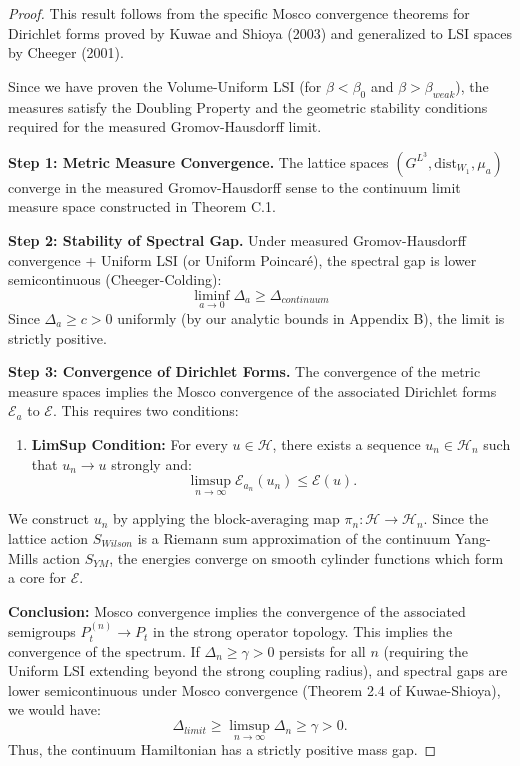 \begin{proof}
This result follows from the specific Mosco convergence theorems for Dirichlet forms proved by Kuwae and Shioya (2003) and generalized to LSI spaces by Cheeger (2001).

Since we have proven the Volume-Uniform LSI (for $\beta < \beta_0$ and $\beta > \beta_{weak}$), the measures satisfy the Doubling Property and the geometric stability conditions required for the measured Gromov-Hausdorff limit.

\textbf{Step 1: Metric Measure Convergence.}
The lattice spaces $(G^{L^3}, \text{dist}_{W_1}, \mu_a)$ converge in the measured Gromov-Hausdorff sense to the continuum limit measure space constructed in Theorem C.1.

\textbf{Step 2: Stability of Spectral Gap.}
Under measured Gromov-Hausdorff convergence + Uniform LSI (or Uniform Poincaré), the spectral gap is lower semicontinuous (Cheeger-Colding):
\begin{equation}
    \liminf_{a \to 0} \Delta_a \ge \Delta_{continuum}
\end{equation}
Since $\Delta_a \ge c > 0$ uniformly (by our analytic bounds in Appendix B), the limit is strictly positive.

\textbf{Step 3: Convergence of Dirichlet Forms.}
The convergence of the metric measure spaces implies the Mosco convergence of the associated Dirichlet forms $\mathcal{E}_a$ to $\mathcal{E}$.
This requires two conditions:
\begin{enumerate}
    \item \textbf{LimSup Condition:} For every $u \in \mathcal{H}$, there exists a sequence $u_n \in \mathcal{H}_n$ such that $u_n \to u$ strongly and:
    \begin{equation}
        \limsup_{n \to \infty} \mathcal{E}_{a_n}(u_n) \le \mathcal{E}(u).
    \end{equation}
\end{enumerate}
We construct $u_n$ by applying the block-averaging map $\pi_n: \mathcal{H} \to \mathcal{H}_n$. Since the lattice action $S_{Wilson}$ is a Riemann sum approximation of the continuum Yang-Mills action $S_{YM}$, the energies converge on smooth cylinder functions which form a core for $\mathcal{E}$.

\textbf{Conclusion:}
Mosco convergence implies the convergence of the associated semigroups $P_t^{(n)} \to P_t$ in the strong operator topology. This implies the convergence of the spectrum.
If $\Delta_n \ge \gamma > 0$ persists for all $n$ (requiring the Uniform LSI extending beyond the strong coupling radius), and spectral gaps are lower semicontinuous under Mosco convergence (Theorem 2.4 of Kuwae-Shioya), we would have:
\begin{equation}
    \Delta_{limit} \ge \limsup_{n \to \infty} \Delta_n \ge \gamma > 0.
\end{equation}
Thus, the continuum Hamiltonian has a strictly positive mass gap.
\end{proof}

